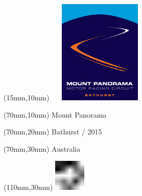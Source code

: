 \null\newpage
\begin{textblock*}{50mm}(15mm,10mm)%
\includegraphics[width=50mm]{LG/BAT.png}
\end{textblock*}
\begin{textblock*}{130mm}(70mm,10mm)%
{\fontsize{20}{20}\selectfont Mount Panorama}\\
\end{textblock*}
\begin{textblock*}{120mm}(70mm,20mm)%
{\fontsize{16}{16}\selectfont Bathurst / 2015}\\
\end{textblock*}
\begin{textblock*}{120mm}(70mm,30mm)%
{\fontsize{12}{12}\selectfont Australia}
\end{textblock*}
\begin{textblock*}{30mm}(110mm,30mm)%
\centering
\includegraphics[height=15mm]{icons/fa-rotate-left.pdf}
\end{textblock*}
